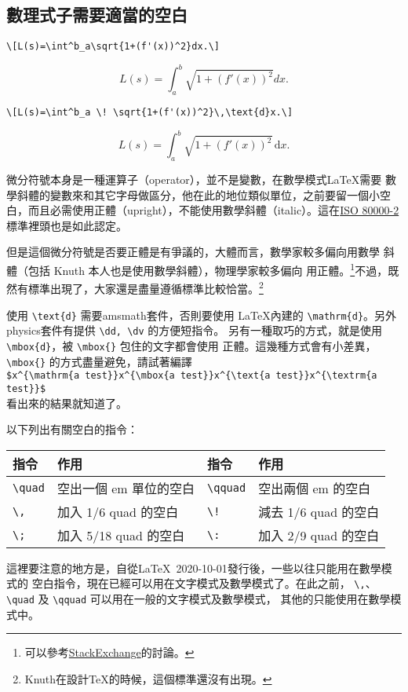 \subsection{數理式子需要適當的空白}

\begin{Wrong}
\begin{verbatim}
\[L(s)=\int^b_a\sqrt{1+(f'(x))^2}dx.\]
\end{verbatim}
\[L(s)=\int^b_a\sqrt{1+(f'(x))^2}dx.\]
\end{Wrong}

\begin{Right}
\begin{verbatim}
\[L(s)=\int^b_a \! \sqrt{1+(f'(x))^2}\,\text{d}x.\]
\end{verbatim}
\[L(s)=\int^b_a \! \sqrt{1+(f'(x))^2} \, \text{d}x.\]
\end{Right}

微分符號本身是一種運算子（operator），並不是變數，在數學模式\LaTeX 需要
數學斜體的變數來和其它字母做區分，他在此的地位類似單位，之前要留一個小空
白，而且必需使用正體（upright），不能使用數學斜體（italic）。這在\href{https://saso.gov.sa/ar/mediacenter/public_multimedia/Documents/SASO-ISO-800000-2-2020-E.pdf}{ISO 80000-2}標準裡頭也是如此認定。

但是這個微分符號是否要正體是有爭議的，大體而言，數學家較多偏向用數學
斜體（包括 Knuth 本人也是使用數學斜體），物理學家較多偏向
用正體。\footnote{可以參考\href{https://tex.stackexchange.com/questions/14821/whats-the-proper-way-to-typeset-a-differential-operator}{\sf StackExchange}的討論。}不過，既然有標準出現了，大家還是盡量遵循標準比較恰當。\footnote{Knuth在設計\TeX 的時候，這個標準還沒有出現。}

使用 \verb|\text{d}| 需要{\sf amsmath}套件，否則要使用 \LaTeX 內建的 \verb|\mathrm{d}|。另外{\sf physics}套件有提供 \verb|\dd, \dv| 的方便短指令。
另有一種取巧的方式，就是使用 \verb|\mbox{d}|，被 \verb|\mbox{}| 包住的文字都會使用
正體。這幾種方式會有小差異，\verb|\mbox{}| 的方式盡量避免，請試著編譯\\
{\small \verb|$x^{\mathrm{a test}}x^{\mbox{a test}}x^{\text{a test}}x^{\textrm{a test}}$|}\\
看出來的結果就知道了。

以下列出有關空白的指令：

\vspace{.5\baselineskip}
\begin{center}
\small
{}
\begin{tabular}{llll}
\hline
指令 & 作用 & 指令 & 作用 \\
\hline
\verb|\quad| & 空出一個 em 單位的空白 & \verb|\qquad| & 空出兩個 em 的空白 \\
\verb|\,| & 加入 1/6 quad 的空白 & \verb|\!| & 減去 1/6 quad 的空白 \\
\verb|\;| & 加入 5/18 quad 的空白 & \verb|\:| & 加入 2/9 quad 的空白\\
\hline
\end{tabular}
\end{center}
\vspace{.5\baselineskip}

這裡要注意的地方是，自從\LaTeX\ 2020-10-01發行後，一些以往只能用在數學模式的
空白指令，現在已經可以用在文字模式及數學模式了。在此之前，
\verb|\,|、\verb|\quad| 及 \verb|\qquad| 可以用在一般的文字模式及數學模式，
其他的只能使用在數學模式中。

\marginpar{\back}

